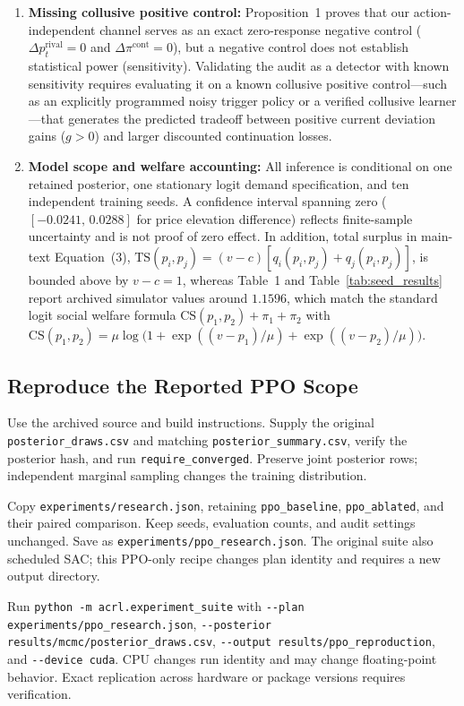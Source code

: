 \documentclass{article}
\begin{document}
\begin{enumerate}
\item \textbf{Missing collusive positive control:} Proposition~1 proves that our action-independent channel serves as an exact zero-response negative control ($\Delta p_t^{\mathrm{rival}}=0$ and $\Delta\pi^{\mathrm{cont}}=0$), but a negative control does not establish statistical power (sensitivity). Validating the audit as a detector with known sensitivity requires evaluating it on a known collusive positive control---such as an explicitly programmed noisy trigger policy or a verified collusive learner---that generates the predicted tradeoff between positive current deviation gains ($g>0$) and larger discounted continuation losses.
\item \textbf{Model scope and welfare accounting:} All inference is conditional on one retained posterior, one stationary logit demand specification, and ten independent training seeds. A confidence interval spanning zero ($[-0.0241,\,0.0288]$ for price elevation difference) reflects finite-sample uncertainty and is not proof of zero effect. In addition, total surplus in main-text Equation~(3), $\mathrm{TS}(p_i,p_j)=(v-c)[q_i(p_i,p_j)+q_j(p_i,p_j)]$, is bounded above by $v-c=1$, whereas Table~1 and Table~\ref{tab:seed_results} report archived simulator values around $1.1596$, which match the standard logit social welfare formula $\mathrm{CS}(p_1,p_2)+\pi_1+\pi_2$ with $\mathrm{CS}(p_1,p_2)=\mu\log\bigl(1+\exp((v-p_1)/\mu)+\exp((v-p_2)/\mu)\bigr)$.
\end{enumerate}

\subsection{Reproduce the Reported PPO Scope}

Use the archived source and build instructions. Supply the original \texttt{posterior\_draws.csv} and matching \texttt{posterior\_summary.csv}, verify the posterior hash, and run \texttt{require\_converged}. Preserve joint posterior rows; independent marginal sampling changes the training distribution.

Copy \texttt{experiments/research.json}, retaining \texttt{ppo\_baseline}, \texttt{ppo\_ablated}, and their paired comparison. Keep seeds, evaluation counts, and audit settings unchanged. Save as \texttt{experiments/ppo\_research.json}. The original suite also scheduled SAC; this PPO-only recipe changes plan identity and requires a new output directory.

Run \texttt{python -m acrl.experiment\_suite} with \texttt{-\/-plan experiments/ppo\_research.json}, \texttt{-\/-posterior results/mcmc/posterior\_draws.csv}, \texttt{-\/-output results/ppo\_reproduction}, and \texttt{-\/-device cuda}. CPU changes run identity and may change floating-point behavior. Exact replication across hardware or package versions requires verification.
\end{document}
